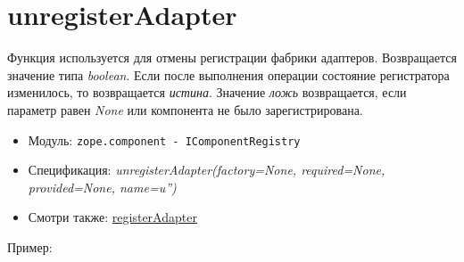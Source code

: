 \documentclass[a4paper,openany,twoside,draft]{book}
\providecommand*{\DUroletitlereference}[1]{\textsl{#1}}
\begin{document}
\section*{unregisterAdapter%
  \label{unregisteradapter}%
}

Функция используется для отмены регистрации фабрики адаптеров.  Возвращается значение типа \DUroletitlereference{boolean}.  Если после выполнения операции состояние регистратора изменилось, то возвращается \DUroletitlereference{истина}.  Значение \DUroletitlereference{ложь} возвращается, если параметр равен \DUroletitlereference{None} или компонента не было зарегистрирована.

\begin{itemize}

\item Модуль: \texttt{zope.component - IComponentRegistry}

\item Спецификация: \DUroletitlereference{unregisterAdapter(factory=None, required=None, provided=None, name=u'')}

\item Смотри также: \hyperref[registeradapter]{registerAdapter}

\end{itemize}

Пример:
\end{document}
